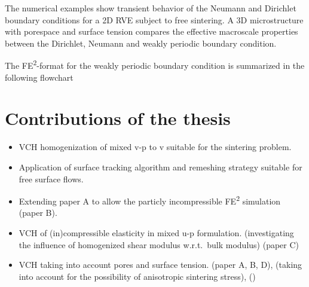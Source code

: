 \documentclass[MikaelDissertation.tex]{subfiles}
\begin{document}
\begin{itemize}
The numerical examples show transient behavior of the Neumann and Dirichlet boundary conditions for a 2D RVE subject to free sintering.
A 3D microstructure with porespace and surface tension compares the effective macroscale properties between the Dirichlet, Neumann and weakly periodic boundary condition.

The FE\textsuperscript{2}-format for the weakly periodic boundary condition is summarized in the following flowchart
\begin{center}
  
\end{center}

\end{itemize}


\chapter{Contributions of the thesis}
\begin{itemize}
 \item VCH homogenization of mixed v-p to v suitable for the sintering problem.
 \item Application of surface tracking algorithm and remeshing strategy suitable for free surface flows.
 \item Extending paper A to allow the particly incompressible FE\textsuperscript{2} simulation (paper B).
 \item VCH of (in)compressible elasticity in mixed u-p formulation.
  (investigating the influence of homogenized shear modulus w.r.t.\ bulk modulus) (paper C)
 \item VCH taking into account pores and surface tension. (paper A, B, D),
  (taking into account for the possibility of anisotropic sintering stress), ()
\end{itemize}


\end{document}
